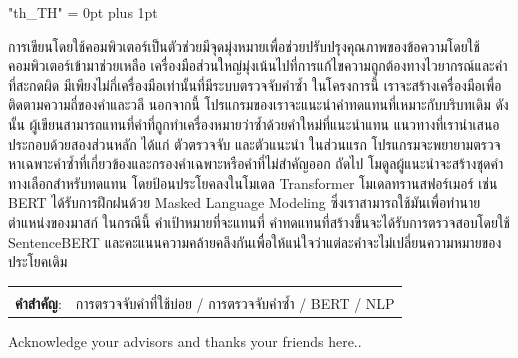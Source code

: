 \documentclass[12pt,oneside,openright,a4paper]{cpe-english-project}
\begin{document}
{
\XeTeXlinebreaklocale "th_TH"	
\XeTeXlinebreakskip = 0pt plus 1pt
\thaifont
\thaiabstract

การเขียนโดยใช้คอมพิวเตอร์เป็นตัวช่วยมีจุดมุ่งหมายเพื่อช่วยปรับปรุงคุณภาพของข้อความโดยใช้คอมพิวเตอร์เข้ามาช่วยเหลือ เครื่องมือส่วนใหญ่มุ่งเน้นไปที่การแก้ไขความถูกต้องทางไวยากรณ์และคำที่สะกดผิด มีเพียงไม่กี่เครื่องมือเท่านั้นที่มีระบบตรวจจับคำซ้ำ ในโครงการนี้ เราจะสร้างเครื่องมือเพื่อติดตามความถี่ของคำและวลี นอกจากนี้ โปรแกรมของเราจะแนะนำคำทดแทนที่เหมาะกับบริบทเดิม ดังนั้น ผู้เขียนสามารถแทนที่คำที่ถูกทำเครื่องหมายว่าซ้ำด้วยคำใหม่ที่แนะนำแทน แนวทางที่เรานำเสนอประกอบด้วยสองส่วนหลัก ได้แก่ ตัวตรวจจับ และตัวแนะนำ ในส่วนแรก โปรแกรมจะพยายามตรวจหาเฉพาะคำซ้ำที่เกี่ยวข้องและกรองคำเฉพาะหรือคำที่ไม่สำคัญออก ถัดไป โมดูลผู้แนะนำจะสร้างชุดคำทางเลือกสำหรับทดแทน โดยป้อนประโยคลงในโมเดล Transformer โมเดลทรานสฟอร์เมอร์ เช่น BERT ได้รับการฝึกฝนด้วย Masked Language Modeling ซึ่งเราสามารถใช้มันเพื่อทำนายตำแหน่งของมาสก์ ในกรณีนี้ คำเป้าหมายที่จะแทนที่ คำทดแทนที่สร้างขึ้นจะได้รับการตรวจสอบโดยใช้ SentenceBERT และคะแนนความคล้ายคลึงกันเพื่อให้แน่ใจว่าแต่ละคำจะไม่เปลี่ยนความหมายของประโยคเดิม

\begin{flushleft}
\begin{tabular*}{\textwidth}{@{}lp{}}
 & \\

\textbf{คำสำคัญ}: & การตรวจจับคำที่ใช้บ่อย / การตรวจจับคำซ้ำ / BERT / NLP
\end{tabular*}
\end{flushleft}
\endabstract
}

\preface
Acknowledge your advisors and thanks your friends here..

\tableofcontents                    
\listoftables
\listoffigures                      
\end{document}
